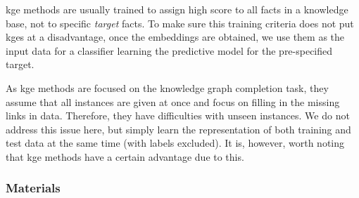\gls{kge} methods are usually trained to assign high score to all facts in a knowledge base, not to specific \textit{target} facts.
To make sure this training criteria does not put \gls{kge}s at a disadvantage, once the embeddings are obtained, we use them as the input data for a classifier learning the predictive model for the pre-specified target.



As \gls{kge} methods are focused on the knowledge graph completion task, they assume that all instances are given at once and focus on filling in the missing links in data.
Therefore, they have difficulties with unseen instances.
We do not address this issue here, but simply learn the representation of both training and test data at the same time (with labels excluded).
It is, however, worth noting that \gls{kge} methods have a certain advantage due to this.




\subsubsection{Materials}



